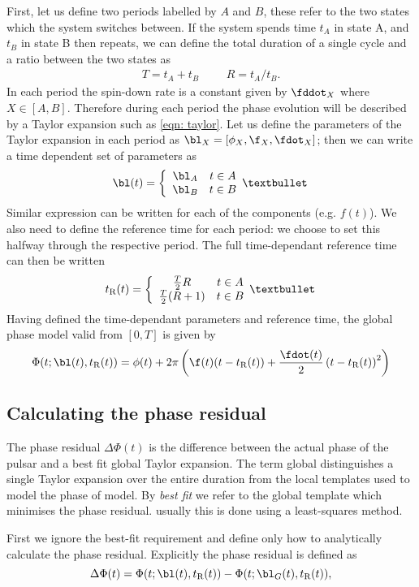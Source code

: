 \documentclass[/home/greg/Thesis/main/main.tex]{subfiles}
\begin{document}
First, let us define two periods labelled by $A$ and $B$, these refer to the
two states which the system switches between. If the system spends time $t_{A}$
in state A, and $t_{B}$ in state B then repeats, we can define the total
duration of a single cycle and a ratio between the two states as
\begin{align}
    T = t_{A} + t_{B}  &&& R = t_{A}/t_{B}.
\end{align}
In each period the spin-down rate is a constant given by $\fddot_{X}$ where $X \in [A, B]$.
Therefore during each period the phase evolution will be described by a Taylor
expansion such as \eqref{eqn: taylor}. Let us define the parameters of the Taylor
expansion 
in each period as $\bl_{X}=[\phi_{X}, \f_{X}, \fdot_{X}]$; then we can 
write a time dependent set of parameters as
\begin{align}
\bl(t) = \two{\bl_{A}}{\bl_{B}} 
\label{eqn: lambda t}
\end{align}
Similar expression can be written for each of the components (e.g. $f(t)$).
We also need to define the reference time for each period: we choose to set this
halfway through the respective period. The full time-dependant
reference time can then be written
\begin{align}
\tref(t) = \two{\frac{T}{2}R}{\frac{T}{2}(R+1)}
\end{align}
Having defined the time-dependant parameters and reference time, the global
phase model valid from $[0, T]$ is given by
\begin{equation}
\Phi(t; \bl(t), \tref(t)) = \phi(t) + 2\pi\left(\f(t)(t-\tref(t)) + \frac{\fdot(t)}{2}\left(t-\tref(t)\right)^{2}\right)
\label{eqn: phase switched}
\end{equation}

\subsection{Calculating the phase residual} The phase residual $\Delta\Phi(t)$ is
the difference between the actual phase of the pulsar and a best fit global
Taylor expansion. The term global distinguishes a single Taylor
expansion over the entire duration from the local templates used to
model the phase of model. By \emph{best fit} we refer to the global template which minimises
the phase residual. usually this is done using a least-squares method.

First we ignore the best-fit requirement and define only how to analytically
calculate the phase residual. Explicitly the phase residual is
defined as
\begin{equation}
\Delta\Phi(t) = \Phi(t; \bl(t), \tref(t)) - \Phi(t; \bl_{G}(t), \tref(t)),
\end{equation}
\end{document}
